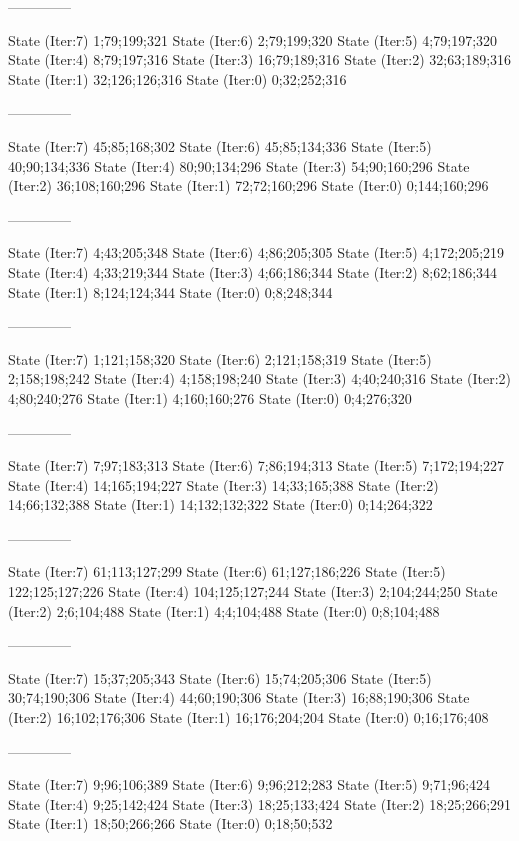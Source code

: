 \documentclass[a4paper,10pt,ngerman]{scrartcl}
\begin{document}
\begin{lstcs}
--------------

State (Iter:7) {1;79;199;321}
State (Iter:6) {2;79;199;320}
State (Iter:5) {4;79;197;320}
State (Iter:4) {8;79;197;316}
State (Iter:3) {16;79;189;316}
State (Iter:2) {32;63;189;316}
State (Iter:1) {32;126;126;316}
State (Iter:0) {0;32;252;316}

--------------

State (Iter:7) {45;85;168;302}
State (Iter:6) {45;85;134;336}
State (Iter:5) {40;90;134;336}
State (Iter:4) {80;90;134;296}
State (Iter:3) {54;90;160;296}
State (Iter:2) {36;108;160;296}
State (Iter:1) {72;72;160;296}
State (Iter:0) {0;144;160;296}

--------------

State (Iter:7) {4;43;205;348}
State (Iter:6) {4;86;205;305}
State (Iter:5) {4;172;205;219}
State (Iter:4) {4;33;219;344}
State (Iter:3) {4;66;186;344}
State (Iter:2) {8;62;186;344}
State (Iter:1) {8;124;124;344}
State (Iter:0) {0;8;248;344}

--------------

State (Iter:7) {1;121;158;320}
State (Iter:6) {2;121;158;319}
State (Iter:5) {2;158;198;242}
State (Iter:4) {4;158;198;240}
State (Iter:3) {4;40;240;316}
State (Iter:2) {4;80;240;276}
State (Iter:1) {4;160;160;276}
State (Iter:0) {0;4;276;320}

--------------

State (Iter:7) {7;97;183;313}
State (Iter:6) {7;86;194;313}
State (Iter:5) {7;172;194;227}
State (Iter:4) {14;165;194;227}
State (Iter:3) {14;33;165;388}
State (Iter:2) {14;66;132;388}
State (Iter:1) {14;132;132;322}
State (Iter:0) {0;14;264;322}

--------------

State (Iter:7) {61;113;127;299}
State (Iter:6) {61;127;186;226}
State (Iter:5) {122;125;127;226}
State (Iter:4) {104;125;127;244}
State (Iter:3) {2;104;244;250}
State (Iter:2) {2;6;104;488}
State (Iter:1) {4;4;104;488}
State (Iter:0) {0;8;104;488}

--------------

State (Iter:7) {15;37;205;343}
State (Iter:6) {15;74;205;306}
State (Iter:5) {30;74;190;306}
State (Iter:4) {44;60;190;306}
State (Iter:3) {16;88;190;306}
State (Iter:2) {16;102;176;306}
State (Iter:1) {16;176;204;204}
State (Iter:0) {0;16;176;408}

--------------

State (Iter:7) {9;96;106;389}
State (Iter:6) {9;96;212;283}
State (Iter:5) {9;71;96;424}
State (Iter:4) {9;25;142;424}
State (Iter:3) {18;25;133;424}
State (Iter:2) {18;25;266;291}
State (Iter:1) {18;50;266;266}
State (Iter:0) {0;18;50;532}


\end{lstcs}
\end{document}
